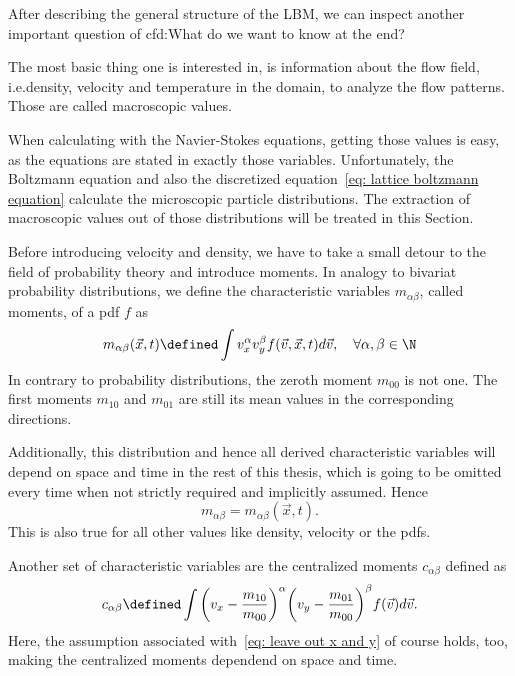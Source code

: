 After describing the general structure of the LBM, we can inspect another important question of \gls{cfd}:\@ What do we want to know at the end?

The most basic thing one is interested in, is information about the flow field, i.e.\@ density, velocity and temperature in the domain, to analyze the flow patterns.
Those are called macroscopic values.

When calculating with the Navier-Stokes equations, getting those values is easy, as the equations are stated in exactly those variables.
Unfortunately, the Boltzmann equation and also the discretized equation~\eqref{eq: lattice boltzmann equation} calculate the microscopic particle distributions.
The extraction of macroscopic values out of those distributions will be treated in this Section.

Before introducing velocity and density, we have to take a small detour to the field of probability theory and introduce moments.
In analogy to bivariat probability distributions, we define the characteristic variables $m_{\alpha\beta}$, called moments, of a \gls{pdf} $f$ as
\begin{equation}
  \label{eq: moments continuous}
  m_{\alpha\beta}(\vec{x},t) \defined  \int v_x^\alpha v_y^\beta f(\vec{v},\vec{x},t) d\vec{v},\quad\forall\alpha,\beta\in\N
\end{equation}
In contrary to probability distributions, the zeroth moment $m_{00}$ is not one. The first moments $m_{10}$ and $m_{01}$ are still its mean values in the corresponding directions.

Additionally, this distribution and hence all derived characteristic variables will depend on space and time in the rest of this thesis, which is going to be omitted every time when not strictly required and implicitly assumed. Hence
\begin{equation}
  \label{eq: leave out x and y}
  m_{\alpha\beta} = m_{\alpha\beta}(\vec{x},t).
\end{equation}
This is also true for all other values like density, velocity or the \glspl{pdf}.

Another set of characteristic variables are the centralized moments $c_{\alpha\beta}$ defined as
\begin{equation}
  \label{eq: central moments continuous}
  c_{\alpha\beta} \defined \int {\left(v_x - \frac{m_{10}}{m_{00}}\right)}^\alpha {\left(v_y-\frac{m_{01}}{m_{00}}\right)}^\beta f(\vec{v})  d\vec{v}.
\end{equation}
Here, the assumption associated with~\eqref{eq: leave out x and y} of course holds, too, making the centralized moments dependend on space and time.

